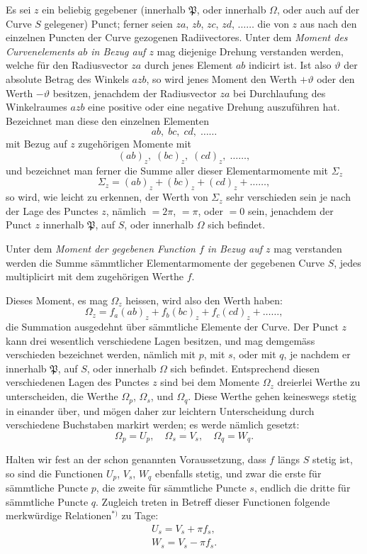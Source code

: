 \documentclass{article}
\begin{document}
Es sei $z$ ein beliebig gegebener (innerhalb $\mathfrak{P}$, oder innerhalb $\Omega$, oder auch auf der Curve $S$ gelegener) Punct; ferner seien $za$, $zb$, $zc$, $zd$, $\ldots\ldots$ die von $z$ aus nach den einzelnen Puncten der Curve gezogenen Radiivectores. Unter dem \emph{Moment des Curvenelements $ab$ in Bezug auf $z$} mag diejenige Drehung verstanden werden, welche für den Radiusvector $za$ durch jenes Element $ab$ indicirt ist. Ist also $\vartheta$ der absolute Betrag des Winkels $azb$, so wird jenes Moment den Werth $+\vartheta$ oder den Werth $-\vartheta$ besitzen, jenachdem der Radiusvector $za$ bei Durchlaufung des Winkelraumes $azb$ eine positive oder eine negative Drehung auszuführen hat. Bezeichnet man diese den einzelnen Elementen
\[
ab,\; bc,\; cd,\; \ldots\ldots
\]
mit Bezug auf $z$ zugehörigen Momente mit
\[
(ab)_{z},\; (bc)_{z},\; (cd)_{z},\; \ldots\ldots,
\]
und bezeichnet man ferner die Summe aller dieser Elementarmomente mit $\Sigma_{z}$
\[
\Sigma_{z}=(ab)_{z}+(bc)_{z}+(cd)_{z}+\ldots\ldots,
\]
so wird, wie leicht zu erkennen, der Werth von $\Sigma_{z}$ sehr verschieden sein je nach der Lage des Punctes $z$, nämlich $=2\pi$, $=\pi$, oder $=0$ sein, jenachdem der Punct $z$ innerhalb $\mathfrak{P}$, auf $S$, oder innerhalb $\Omega$ sich befindet.

Unter dem \emph{Moment der gegebenen Function $f$ in Bezug auf $z$}
mag verstanden werden die Summe sämmtlicher Elementarmomente der gegebenen Curve $S$, jedes multiplicirt mit dem zugehörigen Werthe $f$.

Dieses Moment, es mag $\Omega_{z}$ heissen, wird also den Werth haben:
\[
\Omega_{z}=f_{a}(ab)_{z}+f_{b}(bc)_{z}+f_{c}(cd)_{z}+\ldots\ldots,
\]
die Summation ausgedehnt über sämmtliche Elemente der Curve. Der Punct $z$ kann drei wesentlich verschiedene Lagen besitzen, und mag demgemäss verschieden bezeichnet werden, nämlich mit $p$, mit $s$, oder mit $q$, je nachdem er innerhalb $\mathfrak{P}$, auf $S$, oder innerhalb $\Omega$ sich befindet. Entsprechend diesen verschiedenen Lagen des Punctes $z$ sind bei dem Momente $\Omega_{z}$ dreierlei Werthe zu unterscheiden, die Werthe $\Omega_{p}$, $\Omega_{s}$, und $\Omega_{q}$. Diese Werthe gehen keineswegs stetig in einander über, und mögen daher zur leichtern Unterscheidung durch verschiedene Buchstaben markirt werden; es werde nämlich gesetzt:
\[
\Omega_{p}=U_{p}, \quad \Omega_{s}=V_{s}, \quad \Omega_{q}=W_{q}.
\]

Halten wir fest an der schon genannten Voraussetzung, dass $f$ längs $S$ stetig ist, so sind die Functionen $U_{p}$, $V_{s}$, $W_{q}$ ebenfalls stetig, und zwar die erste für sämmtliche Puncte $p$, die zweite für sämmtliche Puncte $s$, endlich die dritte für sämmtliche Puncte $q$. Zugleich treten in Betreff dieser Functionen folgende merkwürdige Relationen${}^{*)}$ zu Tage:
\[
\begin{gathered}
U_{s}=V_{s}+\pi f_{s},\\
W_{s}=V_{s}-\pi f_{s}.
\end{gathered}
\]
\end{document}
